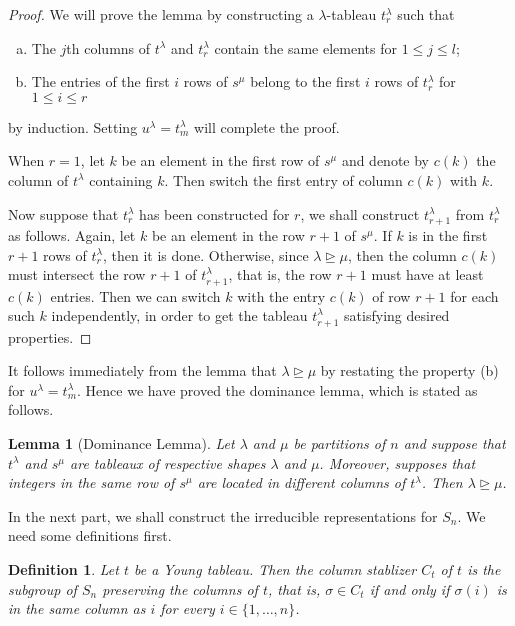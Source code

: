 \documentclass{assignment}[2019/10/15]
\theoremstyle{plain}
\newtheorem{definition}[theorem]{Definition}
\newtheorem{lemma}[theorem]{Lemma}
\numberwithin{equation}{section}
\begin{document}
    \begin{proof}
        We will prove the lemma by constructing a $\lambda$-tableau $t_r^\lambda$ such that
        \begin{enumerate}[(a)]
            \item The $j$th columns of $t^\lambda$ and $t_r^\lambda$ contain the same elements for $1\leq j\leq l$;
            \item The entries of the first $i$ rows of $s^\mu$ belong to the first $i$ rows of $t_r^\lambda$ for $1\leq i \leq r$
        \end{enumerate}
        by induction. Setting $u^\lambda = t_m^\lambda$ will complete the proof.

        When $r=1$, let $k$ be an element in the first row of $s^\mu$ and denote by $c(k)$ the column of $t^\lambda$ containing $k$. Then switch the first entry of column $c(k)$ with $k$.

        Now suppose that $t_r^\lambda$ has been constructed for $r$, we shall construct $t_{r+1}^\lambda$ from $t_r^\lambda$ as follows. Again, let $k$ be an element in the row $r+1$ of $s^\mu$. If $k$ is in the first $r+1$ rows of $t_r^\lambda$, then it is done. Otherwise, since $\lambda\unrhd\mu$, then the column $c(k)$ must intersect the row $r+1$ of $t_{r+1}^\lambda$, that is, the row $r+1$ must have at least $c(k)$ entries. Then we can switch $k$ with the entry $c(k)$ of row $r+1$ for each such $k$ independently, in order to get the tableau $t_{r+1}^\lambda$ satisfying desired properties.
    \end{proof}

    It follows immediately from the lemma that $\lambda\unrhd\mu$ by restating the property (b) for $u^\lambda = t_m^\lambda$. Hence we have proved the dominance lemma, which is stated as follows.

    \begin{lemma}[Dominance Lemma]\label{lem: dom}
        Let $\lambda$ and $\mu$ be partitions of $n$ and suppose that $t^\lambda$ and $s^\mu$ are tableaux of respective shapes $\lambda$ and $\mu$. Moreover, supposes that integers in the same row of $s^\mu$ are located in different columns of $t^\lambda$. Then $\lambda\unrhd\mu$.
    \end{lemma}

    In the next part, we shall construct the irreducible representations for $S_n$. We need some definitions first.

    \begin{definition}
        Let $t$ be a Young tableau. Then the \emph{column stablizer} $C_t$ of $t$ is the subgroup of $S_n$ preserving the columns of $t$, that is, $\sigma\in C_t$ if and only if $\sigma(i)$ is in the same column as $i$ for every $i\in \{1, \dotsc, n\}$.
    \end{definition}
\end{document}

